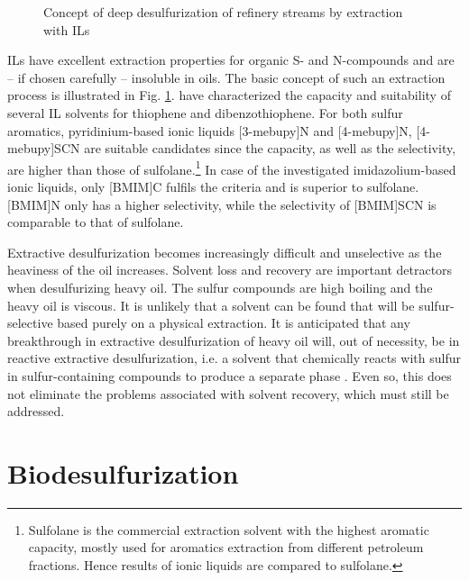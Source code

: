 \begin{figure}[t]
\centering
{}
\caption{Concept of deep desulfurization of refinery streams by extraction
with ILs \citep{B407028C}}
\label{fig:extraction}
\end{figure}


ILs have excellent extraction properties for organic S- and N-compounds and are -- if chosen carefully -- insoluble in oils. The basic concept of such an extraction process is illustrated in Fig. \ref{fig:extraction}. \cite{C1GC15196G} have characterized the capacity and suitability of several IL solvents for thiophene and dibenzothiophene. For both sulfur aromatics, pyridinium-based ionic liquids [3-mebupy]N and [4-mebupy]N, [4-mebupy]SCN are suitable candidates since the capacity, as well as the selectivity, are higher than those of sulfolane.\footnote{Sulfolane is the commercial extraction solvent with the highest aromatic capacity, mostly used for aromatics extraction from different petroleum fractions. Hence results of ionic liquids are compared to sulfolane.} In case of the investigated imidazolium-based ionic liquids, only [BMIM]C fulfils the criteria and is superior to sulfolane. [BMIM]N only has a higher selectivity, while the selectivity of [BMIM]SCN is comparable to that of sulfolane.

Extractive desulfurization becomes increasingly difficult and unselective as the heaviness of the oil increases. Solvent loss and recovery are important detractors when desulfurizing heavy oil. The sulfur compounds are high
boiling and the heavy oil is viscous. It is unlikely that a solvent can be found that will be sulfur-selective based purely on a physical extraction. It is anticipated that any breakthrough in extractive desulfurization of heavy oil will, out of necessity, be in reactive extractive desulfurization, i.e. a solvent that chemically reacts with sulfur in sulfur-containing compounds to produce a separate phase \citep{Javadli}. Even so, this does not eliminate the problems associated with solvent recovery, which must still be addressed.

\section{Biodesulfurization}


